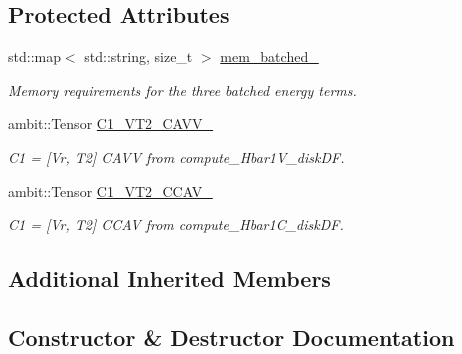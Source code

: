 \subsection*{Protected Attributes}
\begin{DoxyCompactItemize}
\item 
std\+::map$<$ std\+::string, size\+\_\+t $>$ \mbox{\hyperlink{classforte_1_1_s_a___m_r_p_t2_a922e808c913fb674508daafdf0b0bb18}{mem\+\_\+batched\+\_\+}}
\begin{DoxyCompactList}\small\item\em Memory requirements for the three batched energy terms. \end{DoxyCompactList}\item 
ambit\+::\+Tensor \mbox{\hyperlink{classforte_1_1_s_a___m_r_p_t2_a72e288b885b616f20db146c6ffbbfd07}{C1\+\_\+\+V\+T2\+\_\+\+C\+A\+V\+V\+\_\+}}
\begin{DoxyCompactList}\small\item\em C1 = \mbox{[}Vr, T2\mbox{]} C\+A\+VV from compute\+\_\+\+Hbar1\+V\+\_\+disk\+DF. \end{DoxyCompactList}\item 
ambit\+::\+Tensor \mbox{\hyperlink{classforte_1_1_s_a___m_r_p_t2_ac07fc9e6ea15bcab5e232ff72ed6f7d9}{C1\+\_\+\+V\+T2\+\_\+\+C\+C\+A\+V\+\_\+}}
\begin{DoxyCompactList}\small\item\em C1 = \mbox{[}Vr, T2\mbox{]} C\+C\+AV from compute\+\_\+\+Hbar1\+C\+\_\+disk\+DF. \end{DoxyCompactList}\end{DoxyCompactItemize}
\subsection*{Additional Inherited Members}


\subsection{Constructor \& Destructor Documentation}
\mbox{\label{classforte_1_1_s_a___m_r_p_t2_a14395e3547bb4ada71c71d0ed0ffe7ae}} 
